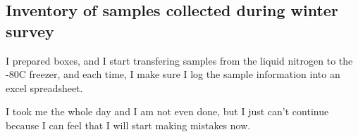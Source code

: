 \subsection{Inventory of samples collected during winter survey}
\label{task:20180310_cj0}


I prepared boxes, and I start transfering samples from the liquid nitrogen to the -80\degree C freezer, and each time, I make sure I log the sample information into an excel spreadsheet.

I took me the whole day and I am not even done, but I just can't continue because I can feel that I will start making mistakes now. 